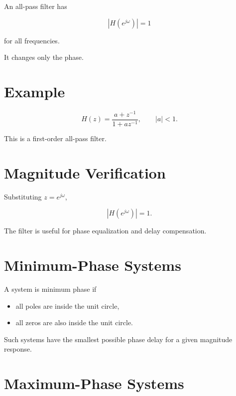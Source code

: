 An all-pass filter has

\[
\boxed{
|H(e^{j\omega})|=1
}
\]

for all frequencies.

It changes only the phase.


\section{Example}

\[
H(z)=
\frac{a+z^{-1}}{1+az^{-1}},
\qquad |a|<1.
\]

This is a first-order all-pass filter.


\section{Magnitude Verification}

Substituting \(z=e^{j\omega}\),

\[
|H(e^{j\omega})|=1.
\]

The filter is useful for phase equalization and delay compensation.


\section{Minimum-Phase Systems}

A system is minimum phase if

\begin{itemize}
\item all poles are inside the unit circle,
\item all zeros are also inside the unit circle.
\end{itemize}

Such systems have the smallest possible phase delay for a given magnitude response.


\section{Maximum-Phase Systems}

